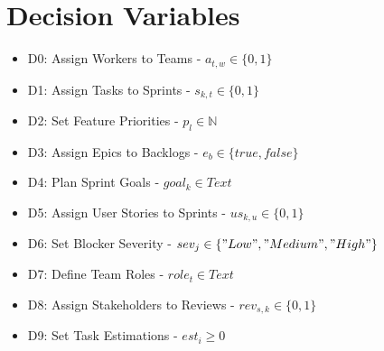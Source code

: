 \documentclass{article}
\begin{document}
\section{Decision Variables}
\begin{itemize}
    \item D0: Assign Workers to Teams - $a_{t,w} \in \{0,1\}$
    \item D1: Assign Tasks to Sprints - $s_{k,t} \in \{0,1\}$
    \item D2: Set Feature Priorities - $p_l \in \mathbb{N}$
    \item D3: Assign Epics to Backlogs - $e_b \in \{true,false\}$
    \item D4: Plan Sprint Goals - $goal_k \in Text$
    \item D5: Assign User Stories to Sprints - $us_{k,u} \in \{0,1\}$
    \item D6: Set Blocker Severity - $sev_j \in \{"Low","Medium","High"\}$
    \item D7: Define Team Roles - $role_t \in Text$
    \item D8: Assign Stakeholders to Reviews - $rev_{s,k} \in \{0,1\}$
    \item D9: Set Task Estimations - $est_i \geq 0$
\end{itemize}
\end{document}
